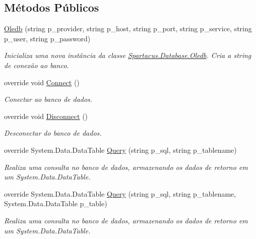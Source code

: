 \subsection*{Métodos Públicos}
\begin{DoxyCompactItemize}
\item 
\hyperlink{classSpartacus_1_1Database_1_1Oledb_a151e92500d1aa88e96169201d3138b0a}{Oledb} (string p\+\_\+provider, string p\+\_\+host, string p\+\_\+port, string p\+\_\+service, string p\+\_\+user, string p\+\_\+password)
\begin{DoxyCompactList}\small\item\em Inicializa uma nova instância da classe \hyperlink{classSpartacus_1_1Database_1_1Oledb}{Spartacus.\+Database.\+Oledb}. Cria a string de conexão ao banco. \end{DoxyCompactList}\item 
override void \hyperlink{classSpartacus_1_1Database_1_1Oledb_aef894ba4132ad7cd504680e5e33e9e9a}{Connect} ()
\begin{DoxyCompactList}\small\item\em Conectar ao banco de dados. \end{DoxyCompactList}\item 
override void \hyperlink{classSpartacus_1_1Database_1_1Oledb_a79d7dfb5d9aa1849f371056093996c9e}{Disconnect} ()
\begin{DoxyCompactList}\small\item\em Desconectar do banco de dados. \end{DoxyCompactList}\item 
override System.\+Data.\+Data\+Table \hyperlink{classSpartacus_1_1Database_1_1Oledb_a6f914652553778f6e0a683ac92ab1f87}{Query} (string p\+\_\+sql, string p\+\_\+tablename)
\begin{DoxyCompactList}\small\item\em Realiza uma consulta no banco de dados, armazenando os dados de retorno em um System.\+Data.\+Data\+Table. \end{DoxyCompactList}\item 
override System.\+Data.\+Data\+Table \hyperlink{classSpartacus_1_1Database_1_1Oledb_ab5f3ae20ac53dcc95182c0845a04d460}{Query} (string p\+\_\+sql, string p\+\_\+tablename, System.\+Data.\+Data\+Table p\+\_\+table)
\begin{DoxyCompactList}\small\item\em Realiza uma consulta no banco de dados, armazenando os dados de retorno em um System.\+Data.\+Data\+Table. \end{DoxyCompactList}\item 

\end{DoxyCompactItemize}
